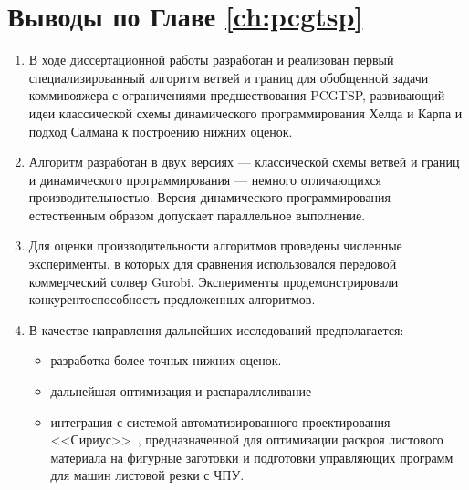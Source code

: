 
\section{Выводы по Главе \ref{ch:pcgtsp}}
\label{sec:pcgtsp.conclude}

\begin{enumerate}
  \item
  В ходе диссертационной работы разработан
  и реализован первый специализированный алгоритм ветвей и границ
  для обобщенной задачи коммивояжера с ограничениями предшествования
  PCGTSP,
  развивающий идеи классической схемы динамического программирования
  Хелда и Карпа и подход Салмана к построению нижних оценок.
  \item
  Алгоритм разработан в двух версиях ---
  классической схемы ветвей и границ и динамического программирования ---
  немного отличающихся производительностью.
  Версия динамического программирования естественным образом
  допускает параллельное выполнение.
  \item
  Для оценки производительности алгоритмов проведены численные эксперименты,
  в которых для сравнения использовался передовой коммерческий солвер Gurobi.
  Эксперименты продемонстрировали конкурентоспособность предложенных алгоритмов.
  \item
  В качестве направления дальнейших исследований предполагается:
  \begin{itemize}
    \item
    разработка более точных нижних оценок.
    \item
    дальнейшая оптимизация и распараллеливание
    \item
    интеграция с системой автоматизированного проектирования <<Сириус>>~\cite{Obuhovo},
    предназначенной для оптимизации раскроя листового материала
    на фигурные заготовки и подготовки управляющих программ для машин листовой резки с ЧПУ.
  \end{itemize}
\end{enumerate}
